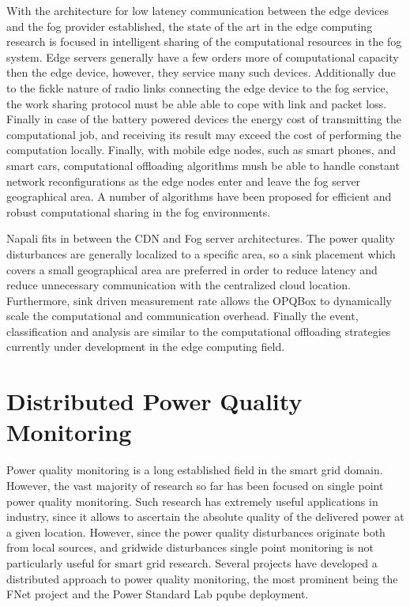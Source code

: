 With the architecture for low latency communication between the edge devices and the fog provider established, the state of the art in the edge computing research is focused in intelligent sharing of the computational resources in the fog system. Edge servers generally have a few orders more of computational capacity then the edge device, however, they service many such devices. Additionally due to the fickle nature of radio links connecting the edge device to the fog service, the work sharing protocol must be able able to cope with link and packet loss. Finally in case of the battery powered devices the energy cost of transmitting the computational job, and receiving its result may exceed the cost of performing the computation locally. Finally, with mobile edge nodes, such as smart phones, and smart cars, computational offloading algorithms mush be able to handle constant network reconfigurations as the edge nodes enter and leave the fog server geographical area. A number of algorithms have been proposed for efficient and robust computational sharing in the fog environments. \cite{oueis2015fog} \cite{wang2015mobiscud} \cite{wang2013mobile}

Napali fits in between the CDN and Fog server architectures. The power quality disturbances are generally localized to a specific area, so a sink placement which covers a small geographical area are preferred in order to reduce latency and reduce unnecessary communication with the centralized cloud location. Furthermore, sink driven measurement rate allows the OPQBox to dynamically scale the computational and communication overhead. Finally the event, classification and analysis are similar to the computational offloading strategies currently under development in the edge computing field.

\section{Distributed Power Quality Monitoring}

Power quality monitoring is a long established field in the smart grid domain. However, the vast majority of research so far has been focused on single point power quality monitoring.\cite{silva2017development} Such research has extremely useful applications in industry, since it allows to ascertain the absolute quality of the delivered power at a given location. However, since the power quality disturbances originate both from local sources, and gridwide disturbances single point monitoring is not particularly useful for smart grid research. Several projects have developed a distributed approach to power quality monitoring, the most prominent being the FNet project and the Power Standard Lab pqube deployment. 

